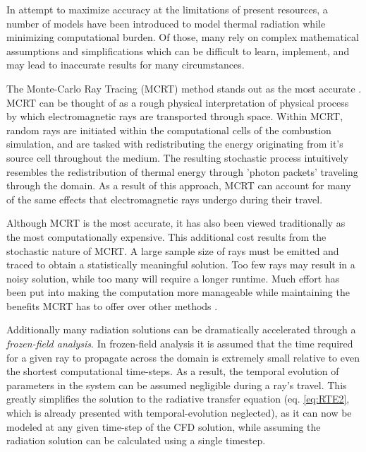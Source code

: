 In attempt to maximize accuracy at the limitations of present resources, a number of models have been introduced to model thermal radiation while minimizing computational burden.
Of those, many rely on complex mathematical assumptions and simplifications which can be difficult to learn, implement, and may lead to inaccurate results for many circumstances. 


The Monte-Carlo Ray Tracing (MCRT) method stands out as the most accurate \cite{Tesse2002RadiativeApproach,Modest2013RadiativeTransfer,Coelho2018RadiativeSystems}. 
MCRT can be thought of as a rough physical interpretation of physical process by which electromagnetic rays are transported through space.
Within MCRT, random rays are initiated within the computational cells of the combustion simulation, and are tasked with redistributing the energy originating from it's source cell throughout the medium. The resulting stochastic process intuitively resembles the redistribution of thermal energy through 'photon packets' traveling through the domain.
As a result of this approach, MCRT can account for many of the same effects that electromagnetic rays undergo during their travel.

Although MCRT is the most accurate, it has also been viewed traditionally as the most computationally expensive.
This additional cost results from the stochastic nature of MCRT. A large sample size of rays must be emitted and traced to obtain a statistically meaningful solution. 
Too few rays may result in a noisy solution, while too many will require a longer runtime.
Much effort has been put into making the computation more manageable while maintaining the benefits MCRT has to offer over other methods \cite{Liu2020TheFlames,Tesse2002RadiativeApproach,Zeeb2001AnGeometries,Modest2003BackwardTransfer,Howell2010ThermalTransfer}.

Additionally many radiation solutions can be dramatically accelerated through a \textit{frozen-field analysis}. In frozen-field analysis it is assumed that the time required for a given ray to propagate across the domain is extremely small relative to even the shortest computational time-steps. 
As a result, the temporal evolution of parameters in the system can be assumed negligible during a ray's travel.
This greatly simplifies the solution to the radiative transfer equation (eq. \ref{eq:RTE2}, which is already presented with temporal-evolution neglected), as it can now be modeled at any given time-step of the CFD solution, while assuming the radiation solution can be calculated using a single timestep.

